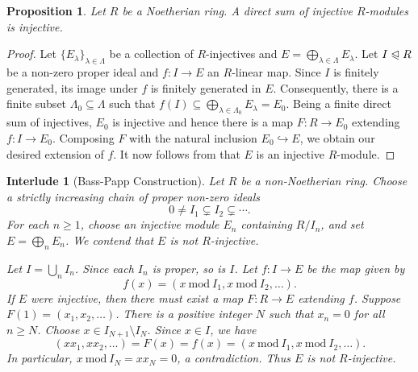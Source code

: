 \documentclass[10pt]{article}
\theoremstyle{thmstyle}
\newtheorem{proposition}[theorem]{Proposition}
\theoremstyle{defstyle}
\newtheorem{interlude}[theorem]{Interlude}
\newcommand{\into}{\hookrightarrow}
\renewcommand{\mod}{~\mathrm{mod}~}
\renewcommand{\ge}{\geqslant}
\newcommand{\noreq}{\trianglelefteqslant}
\begin{document}
\begin{proposition}
    Let $R$ be a Noetherian ring. A direct sum of injective $R$-modules is injective.
\end{proposition}
\begin{proof}
    Let $\{E_\lambda\}_{\lambda\in\Lambda}$ be a collection of $R$-injectives and $E = \bigoplus_{\lambda\in\Lambda} E_\lambda$. Let $I\noreq R$ be a non-zero proper ideal and $f: I\to E$ an $R$-linear map. Since $I$ is finitely generated, its image under $f$ is finitely generated in $E$. Consequently, there is a finite subset $\Lambda_0\subseteq\Lambda$ such that $f(I)\subseteq\bigoplus_{\lambda\in\Lambda_0} E_\lambda = E_0$. Being a finite direct sum of injectives, $E_0$ is injective and hence there is a map $F: R\to E_0$ extending $f: I\to E_0$. Composing $F$ with the natural inclusion $E_0\into E$, we obtain our desired extension of $f$. It now follows from  that $E$ is an injective $R$-module.
\end{proof}

\begin{interlude}[Bass-Papp Construction]
    Let $R$ be a non-Noetherian ring. Choose a strictly increasing chain of proper non-zero ideals 
    \begin{equation*}
        0\ne I_1\subsetneq I_2\subsetneq\cdots.
    \end{equation*}
    For each $n\ge 1$, choose an injective module $E_n$ containing $R/I_n$, and set $E = \bigoplus_n E_n$. We contend that $E$ is not $R$-injective. 

    Let $I = \bigcup_n I_n$. Since each $I_n$ is proper, so is $I$. Let $f: I\to E$ be the map given by 
    \begin{equation*}
        f(x) = \left(x\mod I_1, x\mod I_2, \dots\right).
    \end{equation*}
    If $E$ were injective, then there must exist a map $F: R\to E$ extending $f$. Suppose $F(1) = (x_1, x_2, \dots)$. There is a positive integer $N$ such that $x_n = 0$ for all $n\ge N$. Choose $x\in I_{N + 1}\setminus I_N$. Since $x\in I$, we have 
    \begin{equation*}
        (xx_1, xx_2, \dots) = F(x) = f(x) = \left(x\mod I_1, x\mod I_2, \dots\right).
    \end{equation*}
    In particular, $x\mod I_N = xx_N = 0$, a contradiction. Thus $E$ is not $R$-injective.
\end{interlude}
\end{document}
